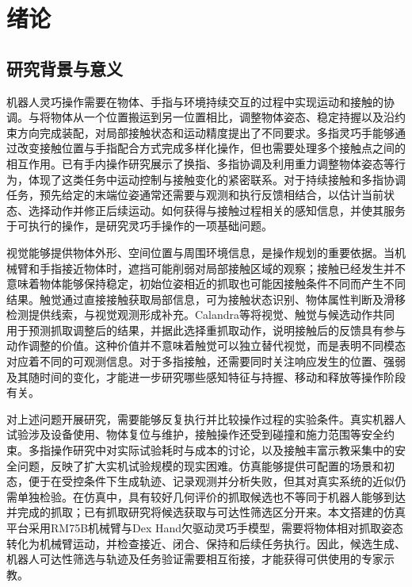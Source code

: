 \chapter{绪论}
\label{chap:ch01_introduction}

\section{研究背景与意义}
\label{sec:research_background}

机器人灵巧操作需要在物体、手指与环境持续交互的过程中实现运动和接触的协调。与将物体从一个位置搬运到另一位置相比，调整物体姿态、稳定持握以及沿约束方向完成装配，对局部接触状态和运动精度提出了不同要求。多指灵巧手能够通过改变接触位置与手指配合方式完成多样化操作，但也需要处理多个接触点之间的相互作用。已有手内操作研究展示了换指、多指协调及利用重力调整物体姿态等行为，体现了这类任务中运动控制与接触变化的紧密联系\cite{openai2020dexterous}。对于持续接触和多指协调任务，预先给定的末端位姿通常还需要与观测和执行反馈相结合，以估计当前状态、选择动作并修正后续运动。如何获得与接触过程相关的感知信息，并使其服务于可执行的操作，是研究灵巧手操作的一项基础问题。

视觉能够提供物体外形、空间位置与周围环境信息，是操作规划的重要依据。当机械臂和手指接近物体时，遮挡可能削弱对局部接触区域的观察；接触已经发生并不意味着物体能够保持稳定，初始位姿相近的抓取也可能因接触条件不同而产生不同结果。触觉通过直接接触获取局部信息，可为接触状态识别、物体属性判断及滑移检测提供线索，与视觉观测形成补充\cite{luo2017tactile}。Calandra等将视觉、触觉与候选动作共同用于预测抓取调整后的结果，并据此选择重抓取动作，说明接触后的反馈具有参与动作调整的价值\cite{calandra2018feeling}。这种价值并不意味着触觉可以独立替代视觉，而是表明不同模态对应着不同的可观测信息。对于多指接触，还需要同时关注响应发生的位置、强弱及其随时间的变化，才能进一步研究哪些感知特征与持握、移动和释放等操作阶段有关。

对上述问题开展研究，需要能够反复执行并比较操作过程的实验条件。真实机器人试验涉及设备使用、物体复位与维护，接触操作还受到碰撞和施力范围等安全约束。多指操作研究中对实际试验耗时与成本的讨论，以及接触丰富示教采集中的安全问题，反映了扩大实机试验规模的现实困难\cite{openai2020dexterous,fang2024rh20t}。仿真能够提供可配置的场景和初态，便于在受控条件下生成轨迹、记录观测并分析失败，但其对真实系统的近似仍需单独检验\cite{tobin2017randomization}。在仿真中，具有较好几何评价的抓取候选也不等同于机器人能够到达并完成的抓取；已有抓取研究将候选获取与可达性筛选区分开来\cite{bohg2014grasp}。本文搭建的仿真平台采用RM75B机械臂与Dex Hand欠驱动灵巧手模型，需要将物体相对抓取姿态转化为机械臂运动，并检查接近、闭合、保持和后续任务执行。因此，候选生成、机器人可达性筛选与轨迹及任务验证需要相互衔接，才能获得可供使用的专家示教。

